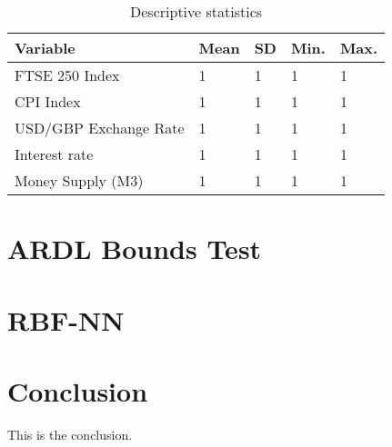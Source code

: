 \documentclass[12pt,a4paper]{article}
\begin{document}
\begin{table}[h!]
    \centering
    \caption{Descriptive statistics}
    \begin{tabular}{lllll}
        \toprule
        \textbf{Variable} & \textbf{Mean} & \textbf{SD} &  \textbf{Min.} & \textbf{Max.}\\
        \midrule
        FTSE 250 Index &  1 & 1 & 1 & 1 \\
        CPI Index &  1 & 1 & 1 & 1 \\
        USD/GBP Exchange Rate &  1 & 1 & 1 & 1 \\
        Interest rate &  1 & 1 & 1 & 1 \\
        Money Supply (M3) &  1 & 1 & 1 & 1 \\
        \bottomrule
    \end{tabular}
\end{table}

\section{ARDL Bounds Test}

\section{RBF-NN}

\section{Conclusion}

This is the conclusion.



\end{document}

